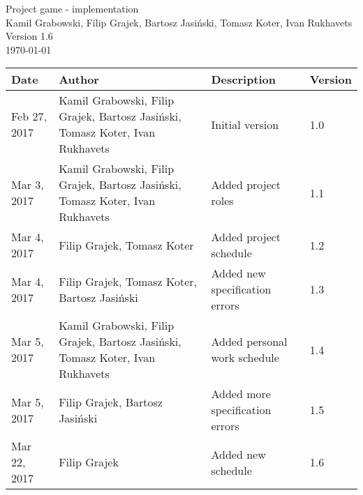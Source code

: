 \documentclass[11pt,a4paper]{article}
\begin{document}
\begin{titlepage}
\centering
\huge Project game - implementation \\
\vspace{1.5cm}
\large Kamil Grabowski, Filip Grajek, Bartosz Jasiński, Tomasz Koter, Ivan Rukhavets \\
\vspace{1.0cm}
Version 1.6 \\
\vspace{1.0cm}
\today
\end{titlepage}

\begin{longtable}{| l | p{4.5cm} | p{4.5cm} | l | }
\hline
\textbf{Date} & \textbf{Author} & \textbf{Description} & \textbf{Version} \\ \hline
Feb 27, 2017 & Kamil Grabowski, Filip Grajek, Bartosz Jasiński, Tomasz Koter, Ivan Rukhavets & Initial version & 1.0 \\ \hline
Mar 3, 2017 & Kamil Grabowski, Filip Grajek, Bartosz Jasiński, Tomasz Koter, Ivan Rukhavets & Added project roles & 1.1 \\ \hline
Mar 4, 2017 & Filip Grajek, Tomasz Koter & Added project schedule & 1.2 \\ \hline
Mar 4, 2017 & Filip Grajek, Tomasz Koter, Bartosz Jasiński & Added new specification errors & 1.3 \\ \hline
Mar 5, 2017 & Kamil Grabowski, Filip Grajek, Bartosz Jasiński, Tomasz Koter, Ivan Rukhavets  & Added personal work schedule& 1.4 \\ \hline
Mar 5, 2017 &  Filip Grajek, Bartosz Jasiński & Added more specification errors& 1.5 \\ \hline
Mar 22, 2017 &  Filip Grajek & Added new schedule & 1.6 \\ \hline
\end{longtable}

\tableofcontents

\newpage
\end{document}
